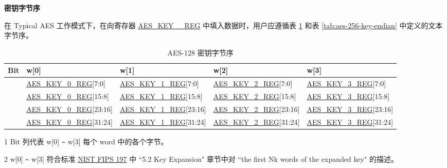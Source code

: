 \documentclass[main\_\_CN.tex]{subfiles}
\begin{document}
\textbf{密钥字节序}

在 Typical AES 工作模式下，在向寄存器 \hyperref[regdesc:AESKEYnREG]{AES\_KEY\_\_REG} 中填入数据时，用户应遵循表 \ref{tab:aes-128-key-endian} 和表 \ref{tab:aes-256-key-endian} 中定义的文本字节序。


\begin{table}[H]
    \centering
    \caption{AES-128 密钥字节序}
    \label{tab:aes-128-key-endian}
    \begin{threeparttable}

    \begin{tabular}{ |l|l|l|l|l| }
    \hline
        \rowcolor{lightgray}
        Bit\tnote{1} &   w[0]    &   w[1]    &   w[2]    &   w[3]\tnote{2}   \\\hline
        [31:24]     &   \hyperref[regdesc:AESKEYnREG]{AES\_KEY\_0\_REG}[7:0]    &   \hyperref[regdesc:AESKEYnREG]{AES\_KEY\_1\_REG}[7:0]    &   \hyperref[regdesc:AESKEYnREG]{AES\_KEY\_2\_REG}[7:0]    &   \hyperref[regdesc:AESKEYnREG]{AES\_KEY\_3\_REG}[7:0]\\ \hline
        [23:16]     &   \hyperref[regdesc:AESKEYnREG]{AES\_KEY\_0\_REG}[15:8]   &   \hyperref[regdesc:AESKEYnREG]{AES\_KEY\_1\_REG}[15:8]   &   \hyperref[regdesc:AESKEYnREG]{AES\_KEY\_2\_REG}[15:8]   &   \hyperref[regdesc:AESKEYnREG]{AES\_KEY\_3\_REG}[15:8]\\ \hline
        [15:8]  &   \hyperref[regdesc:AESKEYnREG]{AES\_KEY\_0\_REG}[23:16]  &   \hyperref[regdesc:AESKEYnREG]{AES\_KEY\_1\_REG}[23:16]  &   \hyperref[regdesc:AESKEYnREG]{AES\_KEY\_2\_REG}[23:16]  &   \hyperref[regdesc:AESKEYnREG]{AES\_KEY\_3\_REG}[23:16]\\ \hline
        [7:0]   &   \hyperref[regdesc:AESKEYnREG]{AES\_KEY\_0\_REG}[31:24]  &   \hyperref[regdesc:AESKEYnREG]{AES\_KEY\_1\_REG}[31:24]  & \hyperref[regdesc:AESKEYnREG]{AES\_KEY\_2\_REG}[31:24]    &   \hyperref[regdesc:AESKEYnREG]{AES\_KEY\_3\_REG}[31:24]\\ \hline
        \end{tabular}

        \begin{tablenotes}
            \item[1] Bit 列代表 w[0] \verb+~+ w[3] 每个 word 中的各个字节。
            \item[2] w[0] \verb+~+ w[3] 符合标准 \href{https://nvlpubs.nist.gov/nistpubs/FIPS/NIST.FIPS.197.pdf}{NIST FIPS 197} 中 ``5.2 Key Expansion" 章节中对 ``the first Nk words of the expanded key" 的描述。
        \end{tablenotes}
    \end{threeparttable}
\end{table}
\end{document}
